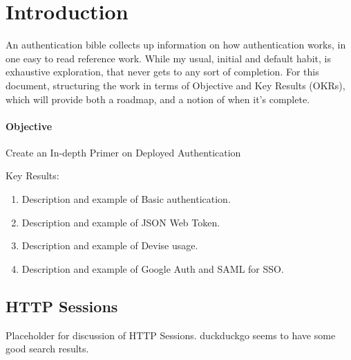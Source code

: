 \section{Introduction}

An authentication bible collects up information on how authentication works,
in one easy to read reference work. While my usual, initial and default habit,
is exhaustive exploration, that never gets to any sort of completion. For this
document, structuring the work in terms of Objective and Key Results (OKRs),
which will provide both a roadmap, and a notion of when it's complete.

\paragraph{Objective} Create an In-depth Primer on Deployed Authentication

Key Results:

\begin{enumerate}[label=KR\arabic*]
  \item Description and example of Basic authentication.
  \item Description and example of JSON Web Token.
  \item Description and example of Devise usage.
  \item Description and example of Google Auth and SAML for SSO.
\end{enumerate}


\subsection{HTTP Sessions}

Placeholder for discussion of HTTP Sessions. duckduckgo seems
to have some good search results.
